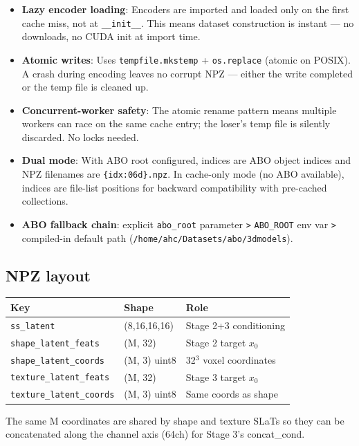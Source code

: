 \begin{itemize}
  \item \textbf{Lazy encoder loading}: Encoders are imported and loaded only on the
  first cache miss, not at \texttt{\_\_init\_\_}. This means dataset construction is
  instant --- no downloads, no CUDA init at import time.
  \item \textbf{Atomic writes}: Uses \texttt{tempfile.mkstemp} + \texttt{os.replace} (atomic on
  POSIX). A crash during encoding leaves no corrupt NPZ --- either the write
  completed or the temp file is cleaned up.
  \item \textbf{Concurrent-worker safety}: The atomic rename pattern means multiple
  workers can race on the same cache entry; the loser's temp file is silently
  discarded. No locks needed.
  \item \textbf{Dual mode}: With ABO root configured, indices are ABO object indices
  and NPZ filenames are \texttt{\{idx:06d\}.npz}. In cache-only mode (no ABO
  available), indices are file-list positions for backward compatibility
  with pre-cached collections.
  \item \textbf{ABO fallback chain}: explicit \texttt{abo\_root} parameter \texttt{>} \texttt{ABO\_ROOT} env
  var \texttt{>} compiled-in default path (\texttt{/home/ahc/Datasets/abo/3dmodels}).
\end{itemize}

\subsection{NPZ layout}

\begin{tabular}{lll}
\toprule
Key & Shape & Role \\
\midrule
\texttt{ss\_latent} & (8,16,16,16) & Stage 2+3 conditioning \\
\texttt{shape\_latent\_feats} & (M, 32) & Stage 2 target $x_0$ \\
\texttt{shape\_latent\_coords} & (M, 3) uint8 & 32$^3$ voxel coordinates \\
\texttt{texture\_latent\_feats} & (M, 32) & Stage 3 target $x_0$ \\
\texttt{texture\_latent\_coords} & (M, 3) uint8 & Same coords as shape \\
\bottomrule
\end{tabular}

The same M coordinates are shared by shape and texture SLaTs so they can
be concatenated along the channel axis (64ch) for Stage 3's concat\_cond.

